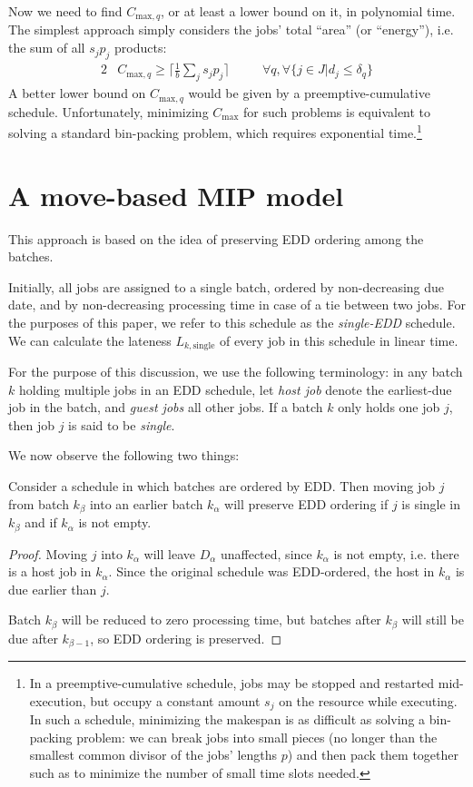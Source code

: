 \documentclass[13pt, letterpaper, oneside]{book}
\begin{document}
Now we need to find $C_{\text{max},q}$, or at least a lower bound on it, in
polynomial time. The simplest approach simply considers the jobs' total ``area''
(or ``energy''), i.e. the sum of all $s_j p_j$ products:
\begin{alignat}{2}
& C_{\text{max},q} \geq \big\lceil\frac{1}{b} \sum_{j} s_j
p_j\big\rceil \quad
&& \forall q, \forall \{ j \in J | d_j \leq \delta_q \}
\end{alignat}
A better lower bound on $C_{\text{max},q}$ would be given by a
preemptive-cumulative schedule. Unfortunately, minimizing $C_{\text{max}}$ for
such problems is equivalent to solving a standard bin-packing problem, which
requires exponential time.\footnote{In a preemptive-cumulative schedule, jobs
may be stopped and restarted mid-execution, but occupy a constant amount $s_j$
on the resource while executing. In such a schedule, minimizing the makespan is
as difficult as solving a bin-packing problem: we can break jobs into small
pieces (no longer than the smallest common divisor of the jobs' lengths $p$) and
then pack them together such as to minimize the number of small time slots
needed.}




\section{A move-based MIP model}
This approach is based on the idea of preserving EDD ordering among the batches.
 
Initially, all jobs are assigned to a single batch, ordered by non-decreasing
due date, and by non-decreasing processing time in case of a tie between two
jobs. For the purposes of this paper, we refer to this schedule as the
\textit{single-EDD} schedule. We can calculate the lateness
$L_{k,\text{single}}$ of every job in this schedule in linear time.

For the purpose of this discussion, we use the following terminology: in any
batch $k$ holding multiple jobs in an EDD schedule, let \textit{host job} denote
the earliest-due job in the batch, and \textit{guest jobs} all other jobs. If a
batch $k$ only holds one job $j$, then job $j$ is said to be \textit{single}.
 
We now observe the following two things:
 
\begin{proposition}
Consider a schedule in which batches are ordered by EDD. Then moving job $j$
from batch $k_\beta$ into an earlier batch $k_\alpha$ will preserve EDD ordering
if $j$ is single in $k_\beta$ and if $k_\alpha$ is not empty.
\end{proposition}
\begin{proof}
Moving $j$ into $k_\alpha$ will leave $D_\alpha$ unaffected, since $k_\alpha$ is
not empty, i.e. there is a host job in $k_\alpha$. Since the original schedule
was EDD-ordered, the host in $k_\alpha$ is due earlier than $j$.
 
Batch $k_\beta$ will be reduced to zero processing time, but batches after
$k_\beta$ will still be due after $k_{\beta - 1}$, so EDD ordering is preserved.
\end{proof}
 
\end{document}
